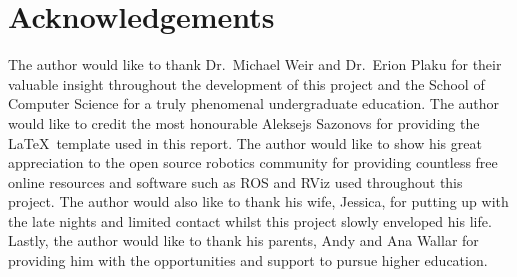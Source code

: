 


\chapter*{Acknowledgements}

\label{chapter:ack}

The author would like to thank Dr.\ Michael Weir and Dr.\ Erion Plaku for their
valuable insight throughout the development of this project and the School of
Computer Science for a truly phenomenal undergraduate education. The author
would like to credit the most honourable Aleksejs Sazonovs for providing the
\LaTeX \, template used in this report. The author would like to show his great
appreciation to the open source robotics community for providing countless free
online resources and software such as ROS and RViz used throughout this
project. The author would also like to thank his wife, Jessica, for putting up
with the late nights and limited contact whilst this project slowly enveloped
his life. Lastly, the author would like to thank his parents, Andy and Ana
Wallar for providing him with the opportunities and support to pursue higher
education.


